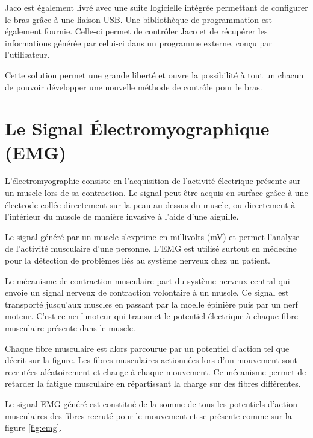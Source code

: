 \documentclass[letterpaper, twoside, 12pt, memoire, creativecommons, hyperref]{thETS}
\begin{document}
Jaco est également livré avec une suite logicielle intégrée permettant de configurer le bras grâce à une liaison USB. Une bibliothèque de programmation est également fournie. Celle-ci permet de contrôler Jaco et de récupérer les informations générée par celui-ci dans un programme externe, conçu par l'utilisateur. 

Cette solution permet une grande liberté et ouvre la possibilité à tout un chacun de pouvoir développer une nouvelle méthode de contrôle pour le bras.

\section{Le Signal Électromyographique (EMG)}

L'électromyographie consiste en l'acquisition de l'activité électrique présente sur un muscle lors de sa contraction. Le signal peut être acquis en surface grâce à une électrode collée directement sur la peau au dessus du muscle, ou directement à l'intérieur du muscle de manière invasive à l'aide d'une aiguille.

Le signal généré par un muscle s'exprime en millivolts (mV) et permet l'analyse de l'activité musculaire d'une personne. L'EMG est utilisé surtout en médecine pour la détection de problèmes liés au système nerveux chez un patient.

Le mécanisme de contraction musculaire part du système nerveux central qui envoie un signal nerveux de contraction volontaire à un muscle. Ce signal est transporté jusqu'aux muscles en passant par la moelle épinière puis par un nerf moteur. C'est ce nerf moteur qui transmet le potentiel électrique à chaque fibre musculaire présente dans le muscle. 

Chaque fibre musculaire est alors parcourue par un potentiel d'action tel que décrit sur la figure. Les fibres musculaires actionnées lors d'un mouvement sont recrutées aléatoirement et change à chaque mouvement. Ce mécanisme permet de retarder la fatigue musculaire en répartissant la charge sur des fibres différentes.

Le signal EMG généré est constitué de la somme de tous les potentiels d'action musculaires des fibres recruté pour le mouvement et se présente comme sur la figure \ref{fig:emg}.
\end{document}
